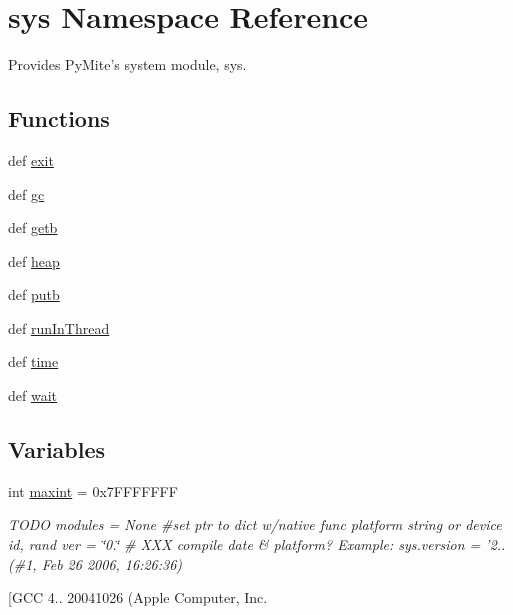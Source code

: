 \hypertarget{namespacesys}{\section{sys Namespace Reference}
\label{namespacesys}
}


Provides Py\-Mite's system module, sys.  


\subsection*{Functions}
\begin{DoxyCompactItemize}
\item 
def \hyperlink{namespacesys_abf45d6eb9e0803f71b96387da92c03e6}{exit}
\item 
def \hyperlink{namespacesys_a2f17e3134854ed811bba00fc14fb4d6b}{gc}
\item 
def \hyperlink{namespacesys_a4c3d074587bc5a80a866bf7faca1b529}{getb}
\item 
def \hyperlink{namespacesys_a31362b57e33b5453fcb29c95cff3393e}{heap}
\item 
def \hyperlink{namespacesys_a3204199ac550a6eda84b5670aeda17e1}{putb}
\item 
def \hyperlink{namespacesys_afd65df0396b14c40ef269eeea7705b38}{run\-In\-Thread}
\item 
def \hyperlink{namespacesys_a8c7f9b5c713403b888d8346afb011cdb}{time}
\item 
def \hyperlink{namespacesys_aa54a8ca456d4efe4ba5b4187241b007a}{wait}
\end{DoxyCompactItemize}
\subsection*{Variables}
\begin{DoxyCompactItemize}
\item 
int \hyperlink{namespacesys_a442ac47f6907b121091f68394fd016ba}{maxint} = 0x7\-F\-F\-F\-F\-F\-F\-F
\begin{DoxyCompactList}\small\item\em T\-O\-D\-O modules = None \#set ptr to dict w/native func platform string or device id, rand ver = \char`\"{}0.\char`\"{} \# X\-X\-X compile date \& platform? Example\-: sys.\-version = '2.. (\#1, Feb 26 2006, 16\-:26\-:36) \par
\mbox{[}G\-C\-C 4.. 20041026 (Apple Computer, Inc. \end{DoxyCompactList}\end{DoxyCompactItemize}


